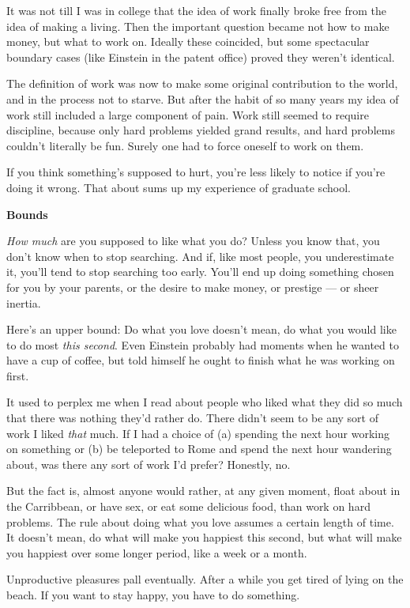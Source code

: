 It was not till I was in college that the idea of work finally broke
free from the idea of making a living. Then the important question
became not how to make money, but what to work on. Ideally these
coincided, but some spectacular boundary cases (like Einstein in the
patent office) proved they weren't identical.

The definition of work was now to make some original contribution to the
world, and in the process not to starve. But after the habit of so many
years my idea of work still included a large component of pain. Work
still seemed to require discipline, because only hard problems yielded
grand results, and hard problems couldn't literally be fun. Surely one
had to force oneself to work on them.

If you think something's supposed to hurt, you're less likely to notice
if you're doing it wrong. That about sums up my experience of graduate
school.

\textbf{Bounds}

\emph{How much} are you supposed to like what you do? Unless you know
that, you don't know when to stop searching. And if, like most people,
you underestimate it, you'll tend to stop searching too early. You'll
end up doing something chosen for you by your parents, or the desire to
make money, or prestige --- or sheer inertia.

Here's an upper bound: Do what you love doesn't mean, do what you would
like to do most \emph{this second}. Even Einstein probably had moments
when he wanted to have a cup of coffee, but told himself he ought to
finish what he was working on first.

It used to perplex me when I read about people who liked what they did
so much that there was nothing they'd rather do. There didn't seem to be
any sort of work I liked \emph{that} much. If I had a choice of (a)
spending the next hour working on something or (b) be teleported to Rome
and spend the next hour wandering about, was there any sort of work I'd
prefer? Honestly, no.

But the fact is, almost anyone would rather, at any given moment, float
about in the Carribbean, or have sex, or eat some delicious food, than
work on hard problems. The rule about doing what you love assumes a
certain length of time. It doesn't mean, do what will make you happiest
this second, but what will make you happiest over some longer period,
like a week or a month.

Unproductive pleasures pall eventually. After a while you get tired of
lying on the beach. If you want to stay happy, you have to do something.

